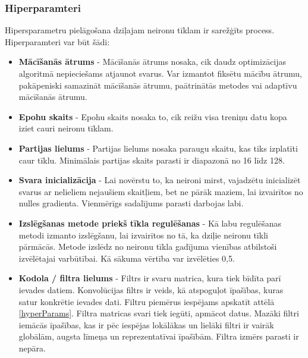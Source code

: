 \documentclass[12pt,paper=A4]{report}
\begin{document}

\subsubsection{Hiperparamteri}

Hipersparametru pielāgošana dziļajam neironu tīklam ir sarežģīts process. Hiperparamteri var būt šādi: 

\begin{itemize}

\item \textbf{Mācīšanās ātrums} - Mācīšanās ātrums nosaka, cik daudz optimizācijas algoritmā nepieciešams atjaunot svarus. Var izmantot fiksētu mācību ātrumu, pakāpeniski samazināt mācīšanās ātrumu, paātrinātās metodes vai adaptīvu mācīšanās ātrumu.


\item \textbf{Epohu skaits} - Epohu skaits nosaka to, cik reižu visa treniņu datu kopa iziet cauri neironu tīklam. 

\item \textbf{Partijas lielums} - Partijas lielums nosaka paraugu skaitu, kas tiks izplatīti caur tīklu. Minimālais partijas skaits parasti ir diapazonā no 16 līdz 128.

\item \textbf{Svara inicializācija} - Lai novērstu to, ka neironi mirst, vajadzētu inicializēt svarus ar nelieliem nejaušiem skaitļiem, bet ne pārāk maziem, lai izvairītos no nulles gradienta. Vienmērīgs sadalījums parasti darbojas labi.

\item \textbf{Izslēgšanas metode priekš tīkla regulēšanas} - Kā labu regulēšanas metodi izmanto izslēgšanu, lai izvairītos no tā, ka dziļie neironu tīkli pārmācās. Metode izslēdz no neironu tīkla gadījuma vienības atbilstoši izvēlētajai varbūtībai. Kā sākuma vērtība var izvēlēties 0,5.

\item \textbf{Kodola / filtra lielums} - Filtrs ir svaru matrica, kura tiek bīdīta parī ievades datiem. Konvolūcijas filtrs ir veids, kā atspoguļot īpašības, kuras satur konkrētie ievades dati. Filtru piemērus iespējams apskatīt attēlā \ref{hyperParams}. Filtra matricas svari tiek iegūti, apmācot datus. Mazāki filtri iemācās īpašības, kas ir pēc iespējas lokālākas un lielāki filtri ir vairāk globālām, augsta līmeņa un reprezentatīvai īpašībām. Filtra izmērs parasti ir nepāra.


\end{itemize}
\end{document}

